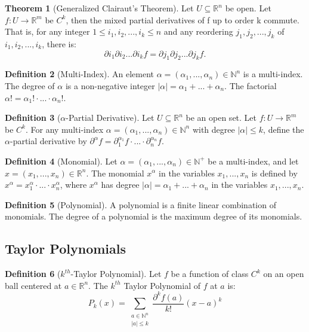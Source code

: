 \documentclass[12pt]{article}
\theoremstyle{definition}
\newtheorem{definition}{Definition}[subsection]
\newtheorem{theorem}[definition]{Theorem}
\theoremstyle{remark}
\begin{document}
\begin{theorem}[Generalized Clairaut's Theorem]
Let $U\subseteq \mathbb{R}^n$ be open. Let $f: U\rightarrow \mathbb{R}^m$ be $C^k$, then the mixed partial derivatives of f up to order k commute. That is, for any integer $1\leq i_1, i_2,...,i_k\leq n$ and any reordering $j_1,j_2,...,j_k$ of $i_1,i_2,...,i_k$, there is:
\[
\partial i_1\partial i_2...\partial i_kf=\partial j_1\partial j_2...\partial j_kf.
\]
\end{theorem}

\begin{definition}[Multi-Index]
An element $\alpha=(\alpha_1,...,\alpha_n)\in\mathbb{N}^n$ is a multi-index. The degree of $\alpha$ is a non-negative integer $|\alpha|=\alpha_1+...+\alpha_n$. The factorial $\alpha!=\alpha_1!\cdot...\cdot\alpha_n!.$
\end{definition}

\begin{definition}[$\alpha$-Partial Derivative]
Let $U\subseteq\mathbb{R}^n$ be an open set. Let $f:U\rightarrow\mathbb{R}^m$ be $C^k$. For any multi-index $\alpha=(\alpha_1,...,\alpha_n)\in\mathbb{N}^n$ with degree $|\alpha|\leq k$, define the $\alpha$-partial derivative by $\partial^{\alpha}f=\partial_1^{\alpha_1}f\cdot...\cdot\partial_n^{\alpha_n}f.$
\end{definition}

\begin{definition}[Monomial]
Let $\alpha=(\alpha_1,...,\alpha_n)\in\mathbb{N}^+$ be a multi-index, and let $x=(x_1,...,x_n)\in\mathbb{R}^n$. The monomial $x^\alpha$ in the variables $x_1,...,x_n$ is defined by $x^\alpha=x_1^\alpha\cdot...\cdot x_n^\alpha$, where $x^\alpha$ has degree $|\alpha|=\alpha_1+...+\alpha_n$ in the variables $x_1,...,x_n$.
\end{definition}

\begin{definition}[Polynomial]
A polynomial is a finite linear combination of monomials. The degree of a polynomial is the maximum degree of its monomials.
\end{definition}

\subsection{Taylor Polynomials}
\begin{definition}[$k^{th}$-Taylor Polynomial]
Let $f$ be a function of class $C^k$ on an open ball centered at $a\in \mathbb{R}^n.$ The $k^{th}$ Taylor Polynomial of $f$ at $a$ is:
\[
P_k(x)=\sum_{\substack{a\in\mathbb N^n\\|a|\le k}}\frac{\partial^k f(a)}{k!}(x-a)^k
\]
\end{definition}
\end{document}
